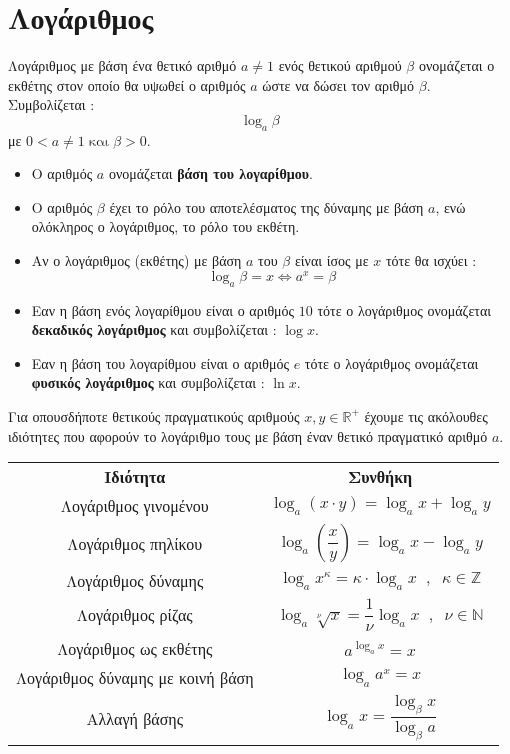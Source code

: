 \section{Λογάριθμος}
\orismoi
{}
Λογάριθμος με βάση ένα θετικό αριθμό $ a\neq1 $ ενός θετικού αριθμού $ \beta $ ονομάζεται ο εκθέτης στον οποίο θα υψωθεί ο αριθμός $ a $ ώστε να δώσει τον αριθμό $ \beta $. Συμβολίζεται :
\[ \log_{a}{\beta} \]
με $ 0<a\neq1\;\textrm{και}\; \beta>0 $.
\begin{itemize}
\item Ο αριθμός $ a $ ονομάζεται \textbf{βάση του λογαρίθμου}.
\item Ο αριθμός $ \beta $ έχει το ρόλο του αποτελέσματος της δύναμης με βάση $ a $, ενώ ολόκληρος ο λογάριθμος, το ρόλο του εκθέτη.
\item Αν ο λογάριθμος (εκθέτης) με βάση $ a $ του $ \beta $ είναι ίσος με $ x $ τότε θα ισχύει :
\[ \log_{a}{\beta}=x\Leftrightarrow a^x=\beta \]
\item Εαν η βάση ενός λογαρίθμου είναι ο αριθμός $ 10 $ τότε ο λογάριθμος ονομάζεται \textbf{δεκαδικός λογάριθμος} και συμβολίζεται : $ \log{x} $.
\item Εαν η βάση του λογαρίθμου είναι ο αριθμός $ e $ τότε ο λογάριθμος ονομάζεται \textbf{φυσικός λογάριθμος} και συμβολίζεται : $ \ln{x} $.
\end{itemize}
\thewrhmata
{}
Για οπουσδήποτε θετικούς πραγματικούς αριθμούς $ x,y\in\mathbb{R}^+ $ έχουμε τις ακόλουθες ιδιότητες που αφορούν το λογάριθμο τους με βάση έναν θετικό πραγματικό αριθμό $ a $.
\begin{center}
\begin{longtable}{cc}
\hline \rule[-2ex]{0pt}{5.5ex} \textbf{Ιδιότητα} & \textbf{Συνθήκη} \\
\hhline{==}\rule[-2ex]{0pt}{5.5ex} Λογάριθμος γινομένου & $ \log_{a}(x\cdot y)=\log_{a}x+\log_{a}y $ \\
\rule[-2ex]{0pt}{5.5ex}  Λογάριθμος πηλίκου & $ \log_{a}\left( \dfrac{x}{y}\right) =\log_{a}x-\log_{a}y $ \\
\rule[-2ex]{0pt}{5.5ex}  Λογάριθμος δύναμης & $ \log_{a}x^\kappa=\kappa\cdot\log_{a}x\;\;,\;\;\kappa\in\mathbb{Z} $ \\
\rule[-2ex]{0pt}{5.5ex}  Λογάριθμος ρίζας & $ \log_{a}\!\sqrt[\nu]{x}=\dfrac{1}{\nu}\log_{a}x\;\;,\;\;\nu\in\mathbb{N} $ \\
\rule[-2ex]{0pt}{5.5ex}  Λογάριθμος ως εκθέτης & $ a^{\log_{a}x}=x $ \\
\rule[-2ex]{0pt}{5.5ex}  Λογάριθμος δύναμης με κοινή βάση & $ \log_{a}a^x=x $ \\
\rule[-2ex]{0pt}{5.5ex}  Αλλαγή βάσης & $ \log_{a}x=\dfrac{\log_{\beta}{x}}{\log_{\beta}{a}} $ \\
\hline
\end{longtable}
\end{center}
